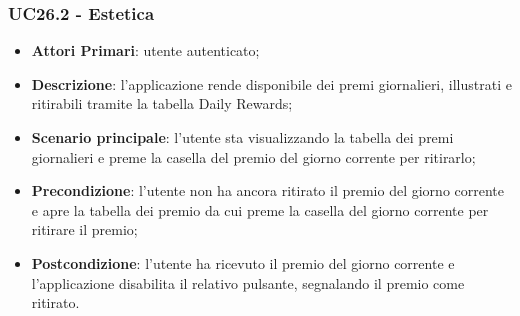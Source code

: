 \subsubsection{UC26.2 - Estetica}
\begin{itemize}
	\item \textbf{Attori Primari}: utente autenticato;
	\item \textbf{Descrizione}: l'applicazione rende disponibile dei premi giornalieri, illustrati e ritirabili tramite la tabella Daily Rewards;
	\item \textbf{Scenario principale}: l'utente sta visualizzando la tabella dei premi giornalieri e preme la casella del premio del giorno corrente per ritirarlo;
	\item \textbf{Precondizione}: l'utente non ha ancora ritirato il premio del giorno corrente e apre la tabella dei premio da cui preme la casella del giorno corrente per ritirare il premio;
	\item \textbf{Postcondizione}: l'utente ha ricevuto il premio del giorno corrente e l'applicazione disabilita il relativo pulsante, segnalando il premio come ritirato. 
\end{itemize} 
